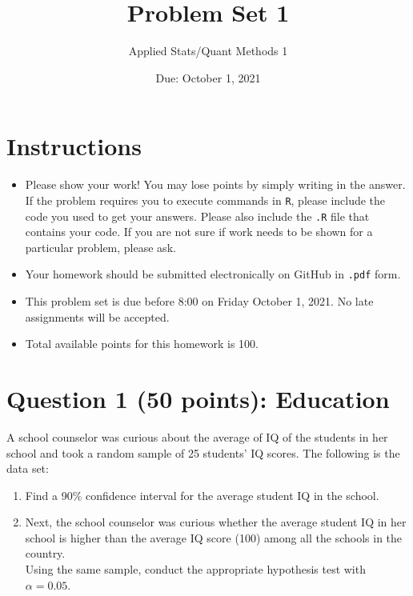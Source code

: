 \documentclass[12pt,letterpaper]{article}
\title{Problem Set 1}
\date{Due: October 1, 2021}
\author{Applied Stats/Quant Methods 1}
\begin{document}
	\maketitle
	
	\section*{Instructions}
	\begin{itemize}
		\item Please show your work! You may lose points by simply writing in the answer. If the problem requires you to execute commands in \texttt{R}, please include the code you used to get your answers. Please also include the \texttt{.R} file that contains your code. If you are not sure if work needs to be shown for a particular problem, please ask.
		\item Your homework should be submitted electronically on GitHub in \texttt{.pdf} form.
		\item This problem set is due before 8:00 on Friday October 1, 2021. No late assignments will be accepted.
		\item Total available points for this homework is 100.
	\end{itemize}
	
	\vspace{1cm}
	\section*{Question 1 (50 points): Education}

A school counselor was curious about the average of IQ of the students in her school and took a random sample of 25 students' IQ scores. The following is the data set:\\
\vspace{.5cm}

  

\vspace{1cm}

\begin{enumerate}
	\item Find a 90\% confidence interval for the average student IQ in the school.\\
	
	\item Next, the school counselor was curious  whether  the average student IQ in her school is higher than the average IQ score (100) among all the schools in the country.\\ 
	
	\noindent Using the same sample, conduct the appropriate hypothesis test with $\alpha=0.05$.
	\end{enumerate}
	
\end{document}
